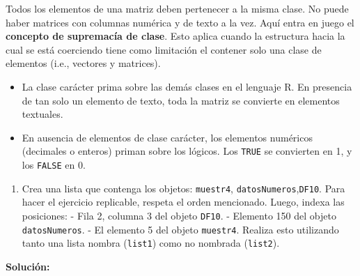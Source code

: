 \documentclass[
]{article}
\newenvironment{Shaded}{\begin{snugshade}}{\end{snugshade}}
\newcommand{\CommentTok}[1]{\textcolor[rgb]{0.56,0.35,0.01}{\textit{#1}}}
\newcommand{\DecValTok}[1]{\textcolor[rgb]{0.00,0.00,0.81}{#1}}
\newcommand{\DocumentationTok}[1]{\textcolor[rgb]{0.56,0.35,0.01}{\textbf{\textit{#1}}}}
\newcommand{\FunctionTok}[1]{\textcolor[rgb]{0.00,0.00,0.00}{#1}}
\newcommand{\NormalTok}[1]{#1}
\newcommand{\OtherTok}[1]{\textcolor[rgb]{0.56,0.35,0.01}{#1}}
\newcommand{\SpecialCharTok}[1]{\textcolor[rgb]{0.00,0.00,0.00}{#1}}
\providecommand{\tightlist}{%
  \setlength{\itemsep}{0pt}\setlength{\parskip}{0pt}}
\theoremstyle{definition}
\theoremstyle{definition}
\theoremstyle{definition}
\theoremstyle{definition}
\theoremstyle{remark}
\begin{document}
Todos los elementos de una matriz deben pertenecer a la misma clase. No puede haber matrices con columnas numérica y de texto a la vez. Aquí entra en juego el \textbf{concepto de supremacía de clase}. Esto aplica cuando la estructura hacia la cual se está coerciendo tiene como limitación el contener solo una clase de elementos (i.e., vectores y matrices).

\begin{itemize}
\tightlist
\item
  La clase carácter prima sobre las demás clases en el lenguaje R. En presencia de tan solo un elemento de texto, toda la matriz se convierte en elementos textuales.
\item
  En ausencia de elementos de clase carácter, los elementos numéricos (decimales o enteros) priman sobre los lógicos. Los \texttt{TRUE} se convierten en 1, y los \texttt{FALSE} en 0.
\end{itemize}

\begin{enumerate}
\def\labelenumi{\arabic{enumi}.}
\tightlist
\item
  Crea una lista que contenga los objetos: \texttt{muestr4}, \texttt{datosNumeros},\texttt{DF10}. Para hacer el ejercicio replicable, respeta el orden mencionado. Luego, indexa las posiciones:
  - Fila 2, columna 3 del objeto \texttt{DF10}.
  - Elemento 150 del objeto \texttt{datosNumeros}.
  - El elemento 5 del objeto \texttt{muestr4}.
  Realiza esto utilizando tanto una lista nombra (\texttt{list1}) como no nombrada (\texttt{list2}).
\end{enumerate}

\textbf{Solución:}

\begin{Shaded}
\end{Shaded}
\end{document}
